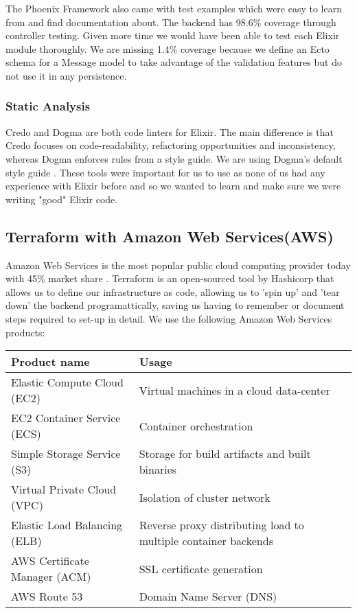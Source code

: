 \documentclass[11pt,a4paper]{report}
\begin{document}
The Phoenix Framework also came with test examples which were easy to learn from and find documentation about. The backend has 98.6\% coverage through controller testing. Given more time we would have been able to test each Elixir module thoroughly. We are missing 1.4\% coverage because we define an Ecto schema for a Message model to take advantage of the validation features but do not use it in any persistence.

\subsubsection{Static Analysis}

Credo and Dogma are both code linters for Elixir. The main difference is that Credo focuses on code-readability, refactoring opportunities and inconsistency, whereas Dogma enforces rules from a style guide. We are using Dogma's default style guide \cite{website:elixir_dogma_rules}. These tools were important for us to use as none of us had any experience with Elixir before and so we wanted to learn and make sure we were writing "good" Elixir code.

\subsection{Terraform with Amazon Web Services(AWS)}

Amazon Web Services is the most popular public cloud computing provider today with 45\% market share \cite{website:geekwire_cloud_share}. Terraform is an open-sourced tool by Hashicorp that allows us to define our infrastructure as code, allowing us to 'spin up' and 'tear down' the backend programattically, saving us having to remember or document steps required to set-up in detail. We use the following Amazon Web Services products:

\begin{tabular}{ | l | p{6cm} |}
  \hline
  Product name & Usage \\
  \hline
  Elastic Compute Cloud (EC2) & Virtual machines in a cloud data-center\\
  EC2 Container Service (ECS) & Container orchestration \\
  Simple Storage Service (S3) & Storage for build artifacts and built binaries \\
  Virtual Private Cloud (VPC) & Isolation of cluster network\\
  Elastic Load Balancing (ELB) & Reverse proxy distributing load to multiple container backends\\
  AWS Certificate Manager (ACM) & SSL certificate generation\\
  AWS Route 53 & Domain Name Server (DNS)\\
  \hline
\end{tabular}
\end{document}
